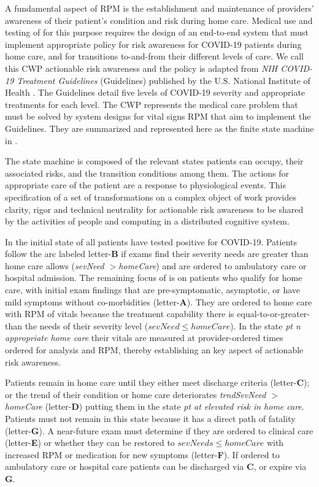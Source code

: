 
A fundamental aspect of RPM is the establishment and maintenance of providers' awareness of their patient’s condition and risk during home care.
Medical use and testing of \phware for this purpose requires the design of an end-to-end system that must implement appropriate policy for risk awareness for COVID-19 patients during home care, and for transitions to-and-from their different levels of care.
We call this CWP actionable risk awareness and the policy is adapted from \emph{NIH COVID-19 Treatment Guidelines} (Guidelines) published by the U.S. National Institute of Health \cite{NIH}.
The Guidelines detail five levels of COVID-19 severity and appropriate treatments for each level.
The CWP represents the medical care problem that must be solved by system designs for vital signs RPM that aim to implement the Guidelines.
They are summarized and represented here as the finite state machine in .

The state machine is composed of the relevant states patients can occupy, their associated risks, and the transition conditions among them. The actions for appropriate care of the patient are a response to physiological events. This specification of a set of transformations on a complex object of work provides clarity, rigor and technical neutrality for actionable risk awareness to be shared by the activities of people and computing in a distributed cognitive system.

In the initial state of  all patients have tested positive for COVID-19. Patients follow the arc labeled letter-\textbf{B} if exams find their severity needs are greater than home care allows (\emph{sevNeed $>$homeCare}) and are ordered to ambulatory care or hospital admission.
The remaining focus of  is on patients who qualify for home care, with initial exam findings that are pre-symptomatic, asymptotic, or have mild symptoms without co-morbidities (letter-\textbf{A}).
They are ordered to home care with RPM of vitals because the treatment capability there is equal-to-or-greater-than the needs of their severity level (\emph{$sevNeed \le homeCare$}).
In the state \emph{pt n appropriate home care} their vitals are measured at provider-ordered times ordered for analysis and RPM, thereby establishing an key aspect of actionable risk awareness.

Patients remain in home care until they either meet discharge criteria (letter-\textbf{C}); or the trend of their condition or home care deteriorates \emph{trndSevNeed $>$homeCare} (letter-\textbf{D}) putting them in the state \emph{pt at elevated risk in home care}.
Patients must not remain in this state because it has a direct path of fatality (letter-\textbf{G}).
A near-future exam must determine if they are ordered to clinical care (letter-\textbf{E}) or whether they can be restored to \emph{$sevNeeds\le homeCare$} with increased RPM or medication for new symptoms (letter-\textbf{F}).
If ordered to ambulatory care or hospital care patients can be discharged via \textbf{C}, or expire via \textbf{G}.

